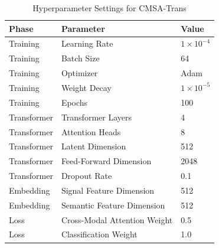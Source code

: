 \begin{table}[htbp]
\centering
\caption{Hyperparameter Settings for CMSA-Trans}
\label{tab:hyperparameters}
\begin{tabular}{p{2.5cm}p{3.5cm}p{3cm}}
\toprule
\textbf{Phase} & \textbf{Parameter} & \textbf{Value} \\
\midrule
Training & Learning Rate & $1 \times 10^{-4}$ \\
\midrule
Training & Batch Size & 64 \\
\midrule
Training & Optimizer & Adam \\
\midrule
Training & Weight Decay & $1 \times 10^{-5}$ \\
\midrule
Training & Epochs & 100 \\
\midrule
Transformer & Transformer Layers & 4 \\
\midrule
Transformer & Attention Heads & 8 \\
\midrule
Transformer & Latent Dimension & 512 \\
\midrule
Transformer & Feed-Forward Dimension & 2048 \\
\midrule
Transformer & Dropout Rate & 0.1 \\
\midrule
Embedding & Signal Feature Dimension & 512 \\
\midrule
Embedding & Semantic Feature Dimension & 512 \\
\midrule
Loss & Cross-Modal Attention Weight & 0.5 \\
\midrule
Loss & Classification Weight & 1.0 \\
\bottomrule
\end{tabular}
\end{table}